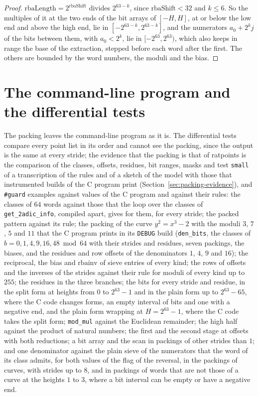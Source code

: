 \begin{proof}
  \leanok
  $\mathrm{rbaLength} = 2^{\mathrm{rbaShift}}$ divides $2^{63-k}$, since $\mathrm{rbaShift} < 32$
  and $k \le 6$. So the multiples of it at the two ends of the bit arrays of $[-H, H]$, at or below
  the low end and above the high end, lie in $[-2^{63-k}, 2^{63-k}]$, and the numerators
  $a_0 + 2^k j$ of the bits between them, with $a_0 < 2^k$, lie in $[-2^{63}, 2^{63})$, which also
  keeps in range the base of the extraction, stepped before each word after the first. The others
  are bounded by the word numbers, the moduli and the bias.
\end{proof}

\section{The command-line program and the differential tests}\label{sec:packingCli}

The packing leaves the command-line program as it is. The differential tests compare every point
list in its order and cannot see the packing, since the output is the same at every stride; the
evidence that the packing is that of ratpoints is the comparison of the classes, offsets, residues,
bit ranges, masks and test \verb|small| of a transcription of the rules and of a sketch of the model
with those that instrumented builds of the C program print (Section~\ref{sec:packing-evidence}), and
\verb|#guard| examples against values of the C program and against their rules: the classes of $64$
words against those that the loop over the classes of \verb|get_2adic_info|, compiled apart, gives
for them, for every stride; the packed pattern against its rule; the packing of the curve
$y^2 = x^3 - 2$ with the moduli $3$, $7$, $5$ and $11$ that the C program prints in its \verb|DEBUG|
build (\verb|den_bits|, the classes of $b = 0, 1, 4, 9, 16, 48 \bmod 64$ with their strides and
residues, seven packings, the biases, and the residues and row offsets of the denominators $1$, $4$,
$9$ and $16$); the reciprocal, the bias and $\mathrm{rbainv}$ of sieve entries of every kind; the
rows of offsets and the inverses of the strides against their rule for moduli of every kind up to
$255$; the residues in the three branches; the bits for every stride and residue, in the split form
at heights from $0$ to $2^{63} - 1$ and in the plain form up to $2^{63} - 65$, where the C code
changes forms, an empty interval of bits and one with a negative end, and the plain form wrapping at
$H = 2^{63} - 1$, where the C code takes the split form; \verb|mod_mul| against the Euclidean
remainder; the high half against the product of natural numbers; the first and the second stage at
offsets with both reductions; a bit array and the scan in packings of other strides than $1$; and
one denominator against the plain sieve of the numerators that the word of its class admits, for
both values of the flag of the reversal, in the packings of curves, with strides up to $8$, and in
packings of words that are not those of a curve at the heights $1$ to $3$, where a bit interval can
be empty or have a negative end.

